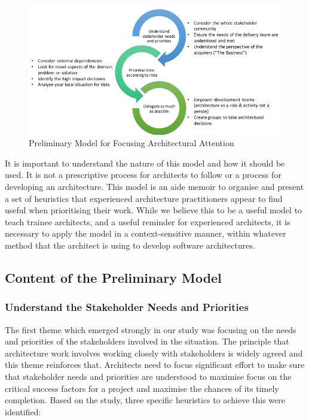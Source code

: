 \begin{figure}
\centering
\includegraphics[width=\textwidth]{Figures/prioritisation-prelim-model}
\caption{Preliminary Model for Focusing Architectural Attention}
\label{figure:prelmodel}
\end{figure}  

It is important to understand the nature of this model and how it should be used.  It is not a prescriptive process for architects to follow or a process for developing an architecture.  This model is an aide memoir to organise and present a set of heuristics that experienced architecture practitioners appear to find useful when prioritising their work.  While we believe this to be a useful model to teach trainee architects, and a useful reminder for experienced architects, it is necessary to apply the model in a context-sensitive manner, within whatever method that the architect is using to develop software architectures.

\subsection{Content of the Preliminary Model}
\label{sec:prelim-model-content}

\subsubsection{Understand the Stakeholder Needs and Priorities}

The first theme which emerged strongly in our study was focusing on the needs and priorities of the stakeholders involved in the situation.  The principle that architecture work involves working closely with stakeholders is widely agreed \cite{rozanski2011-ssa2e, bass2012-sainp} and this theme reinforces that. Architects need to focus significant effort to make sure that stakeholder needs and priorities are understood to maximise focus on the critical success factors for a project and maximise the chances of its timely completion.  Based on the study, three specific heuristics to achieve this were identified:

